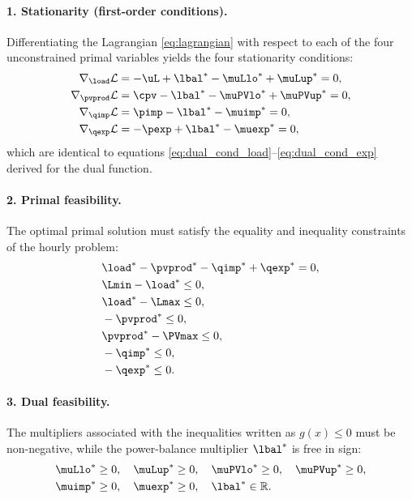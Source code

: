 \paragraph{1. Stationarity (first-order conditions).}
Differentiating the Lagrangian \eqref{eq:lagrangian} with respect to each of the four
unconstrained primal variables yields the four stationarity conditions:
\begin{align}
    \nabla_{\load} \mathcal{L} &= -\uL + {\lbal}^* - {\muLlo}^* + {\muLup}^* = 0, \label{eq:kkt_stat_load} \\
    \nabla_{\pvprod} \mathcal{L} &= \cpv - {\lbal}^* - {\muPVlo}^* + {\muPVup}^* = 0, \label{eq:kkt_stat_pv} \\
    \nabla_{\qimp} \mathcal{L} &= \pimp - {\lbal}^* - {\muimp}^* = 0, \label{eq:kkt_stat_imp} \\
    \nabla_{\qexp} \mathcal{L} &= -\pexp + {\lbal}^* - {\muexp}^* = 0, \label{eq:kkt_stat_exp}
\end{align}
which are identical to equations \eqref{eq:dual_cond_load}--\eqref{eq:dual_cond_exp} derived for
the dual function.

\paragraph{2. Primal feasibility.}
The optimal primal solution must satisfy the equality and inequality constraints of the
hourly problem:
\begin{align}
    & {\load}^* - {\pvprod}^* - {\qimp}^* + {\qexp}^* = 0, \label{eq:kkt_pf_bal} \\
    & \Lmin - {\load}^* \leq 0, \label{eq:kkt_pf_load_lb} \\
    & {\load}^* - \Lmax \leq 0, \label{eq:kkt_pf_load_ub} \\
    & -{\pvprod}^* \leq 0, \label{eq:kkt_pf_pv_lb} \\
    & {\pvprod}^* - \PVmax \leq 0, \label{eq:kkt_pf_pv_ub} \\
    & -{\qimp}^* \leq 0, \label{eq:kkt_pf_imp} \\
    & -{\qexp}^* \leq 0. \label{eq:kkt_pf_exp}
\end{align}

\paragraph{3. Dual feasibility.}
The multipliers associated with the inequalities written as $g(x) \leq 0$ must be
non-negative, while the power-balance multiplier ${\lbal}^*$ is free in sign:
\begin{align}
    & {\muLlo}^* \geq 0, \quad {\muLup}^* \geq 0, \quad {\muPVlo}^* \geq 0, \quad {\muPVup}^* \geq 0, \label{eq:kkt_df_mu} \\
    & {\muimp}^* \geq 0, \quad {\muexp}^* \geq 0, \quad {\lbal}^* \in \mathbb{R}. \label{eq:kkt_df_grid}
\end{align}

